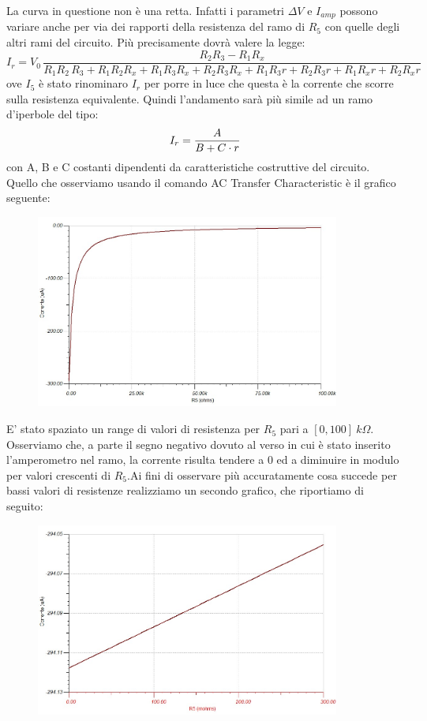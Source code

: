 La curva in questione non è una retta. Infatti i parametri $\Delta V$ e $I_{amp}$ possono variare anche per via dei rapporti della resistenza del ramo di $R_5$ con quelle degli altri rami del circuito. Più precisamente dovrà valere la legge:
\begin{equation*}
    I_r = V_{0}\,\frac{R_{2}R_{3}-R_{1}R_{x}}{R_{1}R_{2}\,R_{3}+R_{1}R_{2}R_{x}+R_{1}R_{3}R_{x}+R_{2}R_{3}R_{x}+R_{1}R_{3}r+R_{2}R_{3}r+R_{1}R_{x}r+R_{2}R_{x}r}
\end{equation*}
ove $I_5$ è stato rinominaro $I_r$ per porre in luce che questa è la corrente che scorre sulla resistenza equivalente.
Quindi l'andamento sarà più simile ad un ramo d'iperbole del tipo:
\begin{equation}
    I_r = {A\over {B + C \cdot r}}
\end{equation}
con A, B e C costanti dipendenti da caratteristiche costruttive del circuito.
Quello che osserviamo usando il comando AC Transfer Characteristic è il grafico seguente:
\begin{figure}[H]
\caption{}
    \includegraphics[width=10cm]{settimana_2/immagini/IvsR5.jpg}
    \centering
\end{figure}
E' stato spaziato un range di valori di resistenza per $R_5$ pari a $[0, 100]\:  k\Omega$. Osserviamo che, a parte il segno negativo dovuto al verso in cui è stato inserito l'amperometro nel ramo, la corrente risulta tendere a 0 ed a diminuire in modulo per valori crescenti di $R_5$.Ai fini di osservare più accuratamente cosa succede per bassi valori di resistenze realizziamo un secondo grafico, che riportiamo di seguito:
\begin{figure}[H]
\caption{}
    \includegraphics[width=10cm]{settimana_2/immagini/IvspiccoleR5.jpg}
    \centering
\end{figure}
